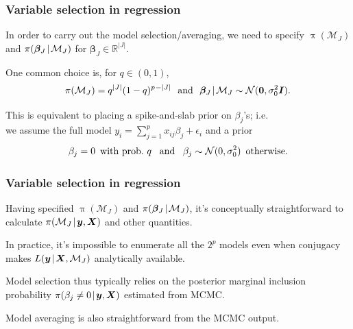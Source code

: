 \documentclass[18pt]{beamer}
\newcommand{\defineTightSpacing}{%
	\setlength{\abovedisplayskip}{.25\baselineskip}%
	\setlength{\belowdisplayskip}{.25\baselineskip}%
}
\renewcommand{\textsc}[1]{{\small \MakeUppercase{#1}}}
\newcommand{\given}{\mskip.7\thinmuskip | \mskip.7\thinmuskip}
\newcommand{\thinnerspace}{\mskip.5\thinmuskip}
\newcommand{\indicator}{\operatorname{\mathds{1}}}
\newcommand{\normalDist}{\operatorname{\mathcal{N}}}
\newcommand{\nPred}{p}
\newcommand{\density}{\operatorname{\pi}}
\newcommand{\likelihood}{L}
\newcommand{\by}{\bm{y}}
\newcommand{\bX}{\bm{X}}
\newcommand{\bbeta}{\bm{\beta}}
\newcommand{\model}{\mathcal{M}}
\newcommand{\nonzeroCoefSet}{J}
\newcommand{\inclusionProb}{q}
\begin{document}
\begin{frame}
\frametitle{Variable selection in regression}
In order to carry out the model selection/averaging, we need to specify $\density(\model_\nonzeroCoefSet)$ and $\density(\bbeta_\nonzeroCoefSet \given \model_\nonzeroCoefSet)$ for $\bbeta_\nonzeroCoefSet \in \mathbb{R}^{|\nonzeroCoefSet|}$. 

\smallskip
One common choice is, for $\inclusionProb \in (0, 1)$,
\begin{equation*} \defineTightSpacing%
\density(\model_\nonzeroCoefSet) = \inclusionProb^{|\nonzeroCoefSet|} (1 - \inclusionProb)^{\nPred \thinnerspace - |\nonzeroCoefSet|}
	\ \text{ and } \ 
	\bbeta_\nonzeroCoefSet \given \model_\nonzeroCoefSet \sim \normalDist(\bm{0}, \sigma_0^2 \bm{I}).
\end{equation*}

This is equivalent to placing a spike-and-slab prior on $\beta_j$'s; i.e.\ \\ 
we assume the full model $y_i = \sum_{j = 1}^\nPred x_{ij} \beta_j + \epsilon_i$ and a prior
\begin{equation*} \defineTightSpacing%
\beta_j = 0 \, \text{ with prob.\ } \inclusionProb
	\ \, \text{ and } \ \,
	\beta_j \sim \normalDist(0, \sigma_0^2)
	\, \text{ otherwise.}
\end{equation*}


\end{frame}


\begin{frame}
\frametitle{Variable selection in regression}
Having specified $\density(\model_\nonzeroCoefSet)$ and $\density(\bbeta_\nonzeroCoefSet \given \model_\nonzeroCoefSet)$, it's conceptually straightforward to calculate $\density(\model_\nonzeroCoefSet \given \by, \bX)$ and other quantities.

In practice, it's impossible to enumerate all the $2^\nPred$ models even when conjugacy makes $\likelihood(\by \given \bX,  \model_\nonzeroCoefSet)$ analytically available.

Model selection thus typically relies on the posterior marginal inclusion probability $\density(\beta_j \neq 0 \given \by, \bX)$ estimated from \textsc{mcmc}. 

Model averaging is also straightforward from the \textsc{mcmc} output. 
\end{frame}
\end{document}
